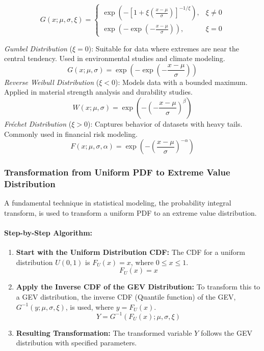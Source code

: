 \[
G(x; \mu, \sigma, \xi) = 
\begin{cases} 
\exp\left(-\left[1 + \xi\left(\frac{x - \mu}{\sigma}\right)\right]^{-1/\xi}\right), & \xi \neq 0 \\
\exp\left(-\exp\left(-\frac{x - \mu}{\sigma}\right)\right), & \xi = 0 
\end{cases}
\]


\textit{Gumbel Distribution} (\( \xi = 0 \)): Suitable for data where extremes are near the central tendency. Used in environmental studies and climate modeling.
        \[ G(x; \mu, \sigma) = \exp\left(-\exp\left(-\frac{x - \mu}{\sigma}\right)\right) \]
\textit{Reverse Weibull Distribution} (\( \xi < 0 \)): Models data with a bounded maximum. Applied in material strength analysis and durability studies.
        \[ W(x; \mu, \sigma) = \exp\left(-\left(-\frac{x - \mu}{\sigma}\right)^\beta\right) \]
\textit{Fréchet Distribution} (\( \xi > 0 \)): Captures behavior of datasets with heavy tails. Commonly used in financial risk modeling.
        \[ F(x; \mu, \sigma, \alpha) = \exp\left(-\left(\frac{x - \mu}{\sigma}\right)^{-\alpha}\right) \]


\subsubsection*{Transformation from Uniform PDF to Extreme Value Distribution}
A fundamental technique in statistical modeling, the probability integral transform, is used to transform a uniform PDF to an extreme value distribution.

\paragraph{Step-by-Step Algorithm:}
\begin{enumerate}
    \item \textbf{Start with the Uniform Distribution CDF:} The CDF for a uniform distribution \(U(0, 1)\) is \(F_U(x) = x\), where \(0 \leq x \leq 1\).
    \[ F_U(x) = x \]
    \item \textbf{Apply the Inverse CDF of the GEV Distribution:} To transform this to a GEV distribution, the inverse CDF (Quantile function) of the GEV, \(G^{-1}(y; \mu, \sigma, \xi)\), is used, where \(y = F_U(x)\).
    \[ Y = G^{-1}(F_U(x); \mu, \sigma, \xi) \]
    \item \textbf{Resulting Transformation:} The transformed variable \(Y\) follows the GEV distribution with specified parameters.
\end{enumerate}

